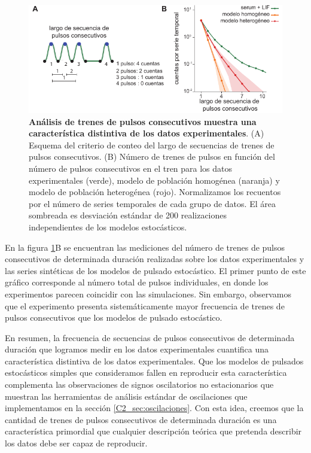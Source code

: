 \documentclass[./main.tex]{subfiles}
\begin{document}
 \begin{figure}
    \centering
    \includegraphics[width=1\columnwidth]{figures/chapter2/C2_seq_pulsos_consecutivos.pdf}\caption{\textbf{Análisis de trenes de pulsos consecutivos muestra una característica distintiva de los datos experimentales}. (A) Esquema del criterio de conteo del largo de secuencias de trenes de pulsos consecutivos. (B) Número de trenes de pulsos en función del número de pulsos consecutivos en el tren para los datos experimentales (verde), modelo de población homogénea (naranja) y modelo de población heterogénea (rojo). Normalizamos los recuentos por el número de series temporales de cada grupo de datos. El área sombreada es desviación estándar de 200 realizaciones independientes de los modelos estocásticos.}
    \label{C2_fig:seq_pulsos_consecutivos} %
\end{figure}


En la figura \ref{C2_fig:seq_pulsos_consecutivos}B se encuentran las mediciones del número de trenes de pulsos consecutivos de determinada duración realizadas sobre los datos experimentales y las series sintéticas de los modelos de pulsado estocástico. El primer punto de este gráfico corresponde al número total de pulsos individuales, en donde los experimentos parecen coincidir con las simulaciones. Sin embargo, observamos que el experimento presenta sistemáticamente mayor frecuencia de trenes de pulsos consecutivos que los modelos de pulsado estocástico. 


En resumen, la frecuencia de secuencias de pulsos consecutivos de determinada duración que logramos medir en los datos experimentales cuantifica una característica distintiva de los datos experimentales. Que los modelos de pulsados estocásticos simples que consideramos fallen en reproducir esta característica complementa las observaciones de signos oscilatorios no estacionarios que muestran las herramientas de análisis estándar de oscilaciones que implementamos en la sección \ref{C2_sec:oscilaciones}. Con esta idea, creemos que la cantidad de trenes de pulsos consecutivos de determinada duración es una característica primordial que cualquier descripción teórica que pretenda describir los datos debe ser capaz de reproducir.
\end{document}
